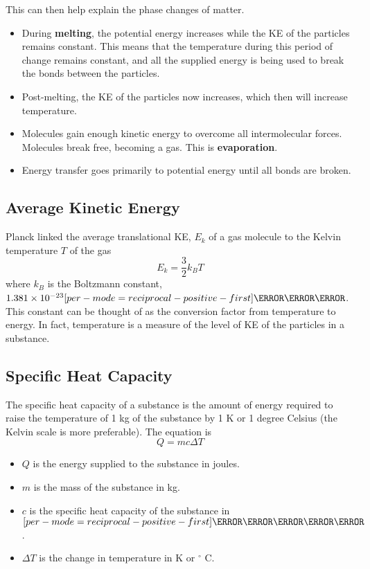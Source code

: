 \documentclass[a4paper,12pt]{article}
\let\oldsi\si
\renewcommand{\si}[1]{\oldsi[per-mode=reciprocal-positive-first]{#1}}
\newcommand{\degsym}{^{\circ}}
\begin{document}
\pagebreak

This can then help explain the phase changes of matter.
\begin{itemize}
  \item During \textbf{melting}, the potential energy increases while the KE of the particles remains constant. This means that the temperature during this period of change remains constant, and all the supplied energy is being used to break the bonds between the particles.
  \item Post-melting, the KE of the particles now increases, which then will increase temperature.
  \item Molecules gain enough kinetic energy to overcome all intermolecular forces. Molecules break free, becoming a gas. This is \textbf{evaporation}.
  \item Energy transfer goes primarily to potential energy until all bonds are broken.
\end{itemize}

\subsection{Average Kinetic Energy}

Planck linked the average translational KE, $E_k$ of a gas molecule to the Kelvin temperature $T$ of the gas
$$E_k = \frac{3}{2}k_BT$$
where $k_B$ is the Boltzmann constant, $1.381 \times 10^{-23} \si{\joule\per\kelvin}$.
This constant can be thought of as the conversion factor from temperature to energy. In fact, temperature is a measure of the level of KE of the particles in a substance.

\pagebreak

\subsection{Specific Heat Capacity}

The specific heat capacity of a substance is the amount of energy required to raise the temperature of 1 kg of the substance by 1 K or 1 degree Celsius (the Kelvin scale is more preferable). The equation is
$$Q = mc\Delta T$$
\begin{itemize}
  \item  $Q$ is the energy supplied to the substance in joules.
  \item $m$ is the mass of the substance in kg.
  \item $c$ is the specific heat capacity of the substance in $\si{\joule\per\kilogram\per\kelvin}$.
  \item $\Delta T$ is the change in temperature in K or $\degsym$ C.
\end{itemize}
\end{document}
